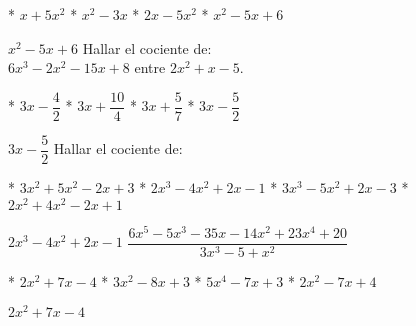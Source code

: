\begin{enum}
  * $x+5x^2$
  * $x^2-3x$
  * $2x-5x^2$
  * $x^2-5x+6$
\end{enum}
$x^2-5x+6$
Hallar el cociente de: \\
$6x^3-2x^2-15x+8$ entre $2x^2+x-5$.
\begin{enum}
  * $3x-\dfrac42$
  * $3x+\dfrac{10}{4}$
  * $3x+\dfrac57$
  * $3x-\dfrac52$
\end{enum}
$3x-\dfrac52$
Hallar el cociente de:
\begin{figure}[h]
\end{figure}
\begin{enum}
  * $3x^2+5x^2-2x+3$
  * $2x^3-4x^2+2x-1$
  * $3x^3-5x^2+2x-3$
  * $2x^2+4x^2-2x+1$
\end{enum}
$2x^3-4x^2+2x-1$
$\dfrac{6x^5-5x^3-35x-14x^2+23x^4+20}{3x^3-5+x^2}$
\begin{enum}
  * $2x^2+7x-4$
  * $3x^2-8x+3$
  * $5x^4-7x+3$
  * $2x^2-7x+4$
\end{enum}
$2x^2+7x-4$

